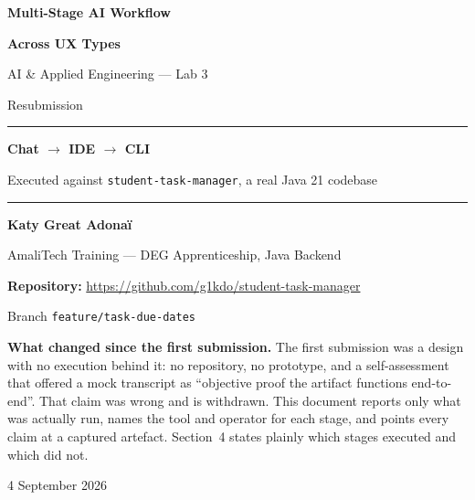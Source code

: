 \documentclass[11pt,a4paper]{article}
\newcommand{\code}[1]{\texttt{\small #1}}
\begin{document}
\begin{titlepage}
\centering
\vspace*{2.2cm}

{\color{accent}\Huge\bfseries Multi-Stage AI Workflow\par}
\vspace{0.4cm}
{\color{accent}\Huge\bfseries Across UX Types\par}
\vspace{0.8cm}
{\LARGE AI \& Applied Engineering --- Lab 3\par}
\vspace{0.3cm}
{\large Resubmission\par}

\vspace{1.6cm}
\rule{0.75\textwidth}{1pt}\par
\vspace{0.7cm}
{\LARGE\bfseries Chat $\rightarrow$ IDE $\rightarrow$ CLI\par}
\vspace{0.35cm}
{\large Executed against \code{student-task-manager}, a real Java 21 codebase\par}
\vspace{0.7cm}
\rule{0.75\textwidth}{1pt}\par

\vspace{2.0cm}
{\large\bfseries Katy Great Adona\"i\par}
\vspace{0.25cm}
{\large AmaliTech Training --- DEG Apprenticeship, Java Backend\par}

\vspace{1.4cm}
{\large\textbf{Repository:} \url{https://github.com/g1kdo/student-task-manager}\par}
{\normalsize Branch \code{feature/task-due-dates}\par}

\vspace{0.9cm}
\begin{minipage}{0.86\textwidth}
\small\centering
\textbf{What changed since the first submission.} The first submission was a
design with no execution behind it: no repository, no prototype, and a
self-assessment that offered a mock transcript as ``objective proof the
artifact functions end-to-end''. That claim was wrong and is withdrawn.
This document reports only what was actually run, names the tool and operator
for each stage, and points every claim at a captured artefact. Section~4 states
plainly which stages executed and which did not.
\end{minipage}

\vfill
{\large 4 September 2026\par}
\end{titlepage}
\end{document}
